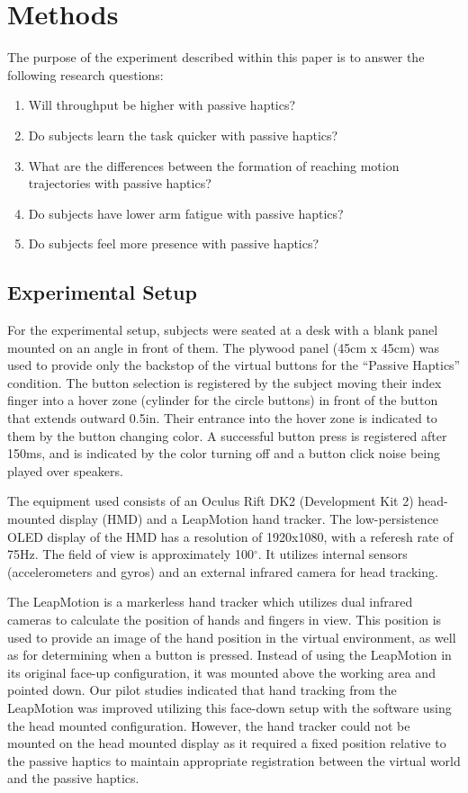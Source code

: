 \section{Methods}

The purpose of the experiment described within this paper is to answer the following research questions:

\begin{enumerate}
    \item Will throughput be higher with passive haptics?
    \item Do subjects learn the task quicker with passive haptics?
    \item What are the differences between the formation of reaching motion trajectories with passive haptics?
    \item Do subjects have lower arm fatigue with passive haptics?
    \item Do subjects feel more presence with passive haptics?
\end{enumerate}

\subsection{Experimental Setup}

For the experimental setup, subjects were seated at a desk with a blank panel mounted on an angle in front of them.
The plywood panel (45cm x 45cm) was used to provide only the backstop of the virtual buttons for the ``Passive Haptics'' condition.
The button selection is registered by the subject moving their index finger into a hover zone (cylinder for the circle buttons) in front of the button that extends outward 0.5in.
Their entrance into the hover zone is indicated to them by the button changing color.
A successful button press is registered after 150ms, and is indicated by the color turning off and a button click noise being played over speakers.

The equipment used consists of an Oculus Rift DK2 (Development Kit 2) head-mounted display (HMD) and a LeapMotion hand tracker.
The low-persistence OLED display of the HMD has a resolution of 1920x1080, with a referesh rate of 75Hz.
The field of view is approximately 100$^\circ$.
It utilizes internal sensors (accelerometers and gyros) and an external infrared camera for head tracking.

The LeapMotion is a markerless hand tracker which utilizes dual infrared cameras to calculate the position of hands and fingers in view.
This position is used to provide an image of the hand position in the virtual environment, as well as for determining when a button is pressed.
Instead of using the LeapMotion in its original face-up configuration, it was mounted above the working area and pointed down.
Our pilot studies indicated that hand tracking from the LeapMotion was improved utilizing this face-down setup with the software using the head mounted configuration.
However, the hand tracker could not be mounted on the head mounted display as it required a fixed position relative to the passive haptics to maintain appropriate registration between the virtual world and the passive haptics.

